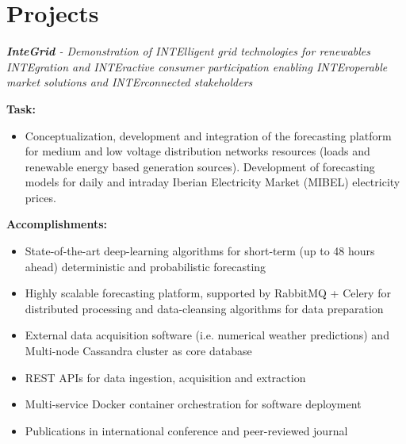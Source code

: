\documentclass{mycv}
\begin{document}
\section{Projects}

	\vspace{0.15cm}	

\begin{myitemize}	
	\item \textit{\textbf{InteGrid} - Demonstration of INTElligent grid technologies for renewables INTEgration and INTEractive consumer participation enabling INTEroperable market solutions and INTErconnected stakeholders}
	
		\vspace{0.15cm}
		\textbf{Task:}
		
		\begin{itemize}[itemsep=1px]
		\item Conceptualization, development and integration of the forecasting platform for medium and low voltage distribution networks resources (loads and renewable energy based generation sources). Development of forecasting models for daily and intraday Iberian Electricity Market (MIBEL) electricity prices.
		\end{itemize}
		
		\textbf{Accomplishments:}
		\begin{itemize}[itemsep=1px]
			\item State-of-the-art deep-learning algorithms for short-term (up to 48 hours ahead) deterministic and probabilistic forecasting
			\item Highly scalable forecasting platform, supported by RabbitMQ + Celery for distributed processing and data-cleansing algorithms for data preparation
			\item External data acquisition software (i.e. numerical weather predictions) and Multi-node Cassandra cluster as core database
			\item REST APIs for data ingestion, acquisition and extraction
			\item Multi-service Docker container orchestration for software deployment
			\item Publications in international conference and peer-reviewed journal
		\end{itemize}
		\vspace{0.2cm}
		
	
	\vspace{0.30cm}	
	

\end{myitemize}
\end{document}
